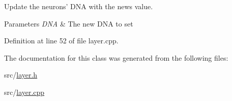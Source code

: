 Update the neurons' D\-N\-A with the news value. 


\begin{DoxyParams}{Parameters}
{\em D\-N\-A} & The new D\-N\-A to set \\
\hline
\end{DoxyParams}


Definition at line 52 of file layer.\-cpp.



The documentation for this class was generated from the following files\-:\begin{DoxyCompactItemize}
\item 
src/\hyperlink{layer_8h}{layer.\-h}\item 
src/\hyperlink{layer_8cpp}{layer.\-cpp}\end{DoxyCompactItemize}
